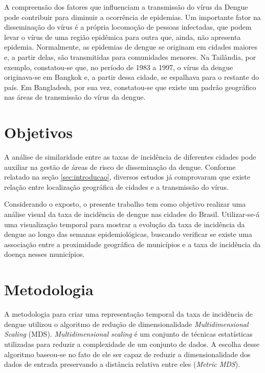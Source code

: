 \documentclass[12pt,openright,twoside,a4paper,article,brazil]{abntex2}
\begin{document}
A compreensão dos fatores que influenciam a transmissão do vírus da Dengue pode contribuir para diminuir a ocorrência de epidemias. Um importante fator na disseminação do vírus é a própria locomoção de pessoas infectadas, que podem levar o vírus de uma região epidêmica para outra que, ainda, não apresenta epidemia. Normalmente, as epidemias de dengue se originam em cidades maiores e, a partir delas, são transmitidas para comunidades menores\cite{cities-spawn-dengue}. Na Tailândia, por exemplo, constatou-se que, no período de 1983 a 1997, o vírus da dengue originava-se em Bangkok e, a partir dessa cidade, se espalhava para o restante do país\cite{travelling-dengue-thailand}. Em Bangladesh, por sua vez, constatou-se que existe um padrão geográfico nas áreas de transmissão do vírus da dengue\cite{dengue-geographic-information-system}.




\section{Objetivos}
\label{sec:objetivos}

A análise de similaridade entre as taxas de incidência de diferentes cidades pode auxiliar na gestão de áreas de risco de disseminação da dengue. Conforme relatado na seção \ref{sec:introducao}, diversos estudos já comprovaram que existe relação entre localização geográfica de cidades e a transmissão do vírus\cite{cities-spawn-dengue}\cite{travelling-dengue-thailand}\cite{dengue-geographic-information-system}.

Considerando o exposto, o presente trabalho tem como objetivo realizar uma análise visual da taxa de incidência de dengue nas cidades do Brasil. Utilizar-se-á uma visualização temporal para mostrar a evolução da taxa de incidência da dengue ao longo das semanas epidemiológicas, buscando verificar se existe uma associação entre a proximidade geográfica de municípios e a taxa de incidência da doença nesses municípios.


\section{Metodologia}
\label{sec:metodologia}



A metodologia para criar uma representação temporal da taxa de incidência de dengue utilizou o algoritmo de redução de dimensionalidade \emph{Multidimensional Scaling} (MDS)\cite{sklearn-mds}. \emph{Multidimensional scaling} é um conjunto de técnicas estatísticas utilizadas para reduzir a complexidade de um conjunto de dados\cite{multidimensional-scaling-book}. A escolha desse algoritmo baseou-se no fato de ele ser capaz de reduzir a dimensionalidade dos dados de entrada preservando a distância relativa entre eles (\emph{Metric MDS}).
\end{document}
